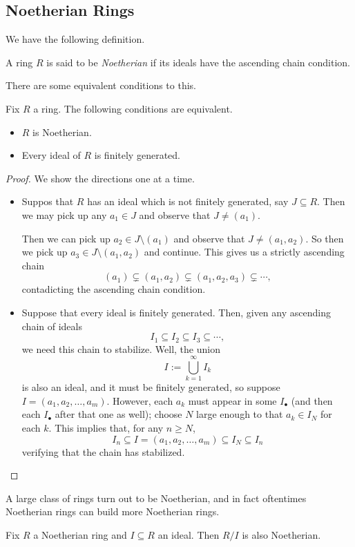 \subsection{Noetherian Rings}
We have the following definition.
\begin{definition}
	A ring $R$ is said to be \textit{Noetherian} if its ideals have the ascending chain condition.
\end{definition}
There are some equivalent conditions to this.
\begin{proposition} \label{prop:noethergrapbag}
	Fix $R$ a ring. The following conditions are equivalent.
	\begin{itemize}
		\item $R$ is Noetherian.
		\item Every ideal of $R$ is finitely generated.
	\end{itemize}
\end{proposition}
\begin{proof}
	We show the directions one at a time.
	\begin{itemize}
		\item Suppos that $R$ has an ideal which is not finitely generated, say $J\subseteq R$. Then we may pick up any $a_1\in J$ and observe that $J\ne(a_1)$.

		Then we can pick up $a_2\in J\setminus(a_1)$ and observe that $J\ne(a_1,a_2)$. So then we pick up $a_3\in J\setminus(a_1,a_2)$ and continue. This gives us a strictly ascending chain
		\[(a_1)\subsetneq(a_1,a_2)\subsetneq(a_1,a_2,a_3)\subsetneq\cdots,\]
		contadicting the ascending chain condition.
		\item Suppose that every ideal is finitely generated. Then, given any ascending chain of ideals
		\[I_1\subseteq I_2\subseteq I_3\subseteq\cdots,\]
		we need this chain to stabilize. Well, the union
		\[I:=\bigcup_{k=1}^\infty I_k\]
		is also an ideal, and it must be finitely generated, so suppose $I=(a_1,a_2,\ldots,a_m)$. However, each $a_k$ must appear in some $I_\bullet$ (and then each $I_\bullet$ after that one as well); choose $N$ large enough to that $a_k\in I_N$ for each $k$. This implies that, for any $n\ge N$,
		\[I_n\subseteq I=(a_1,a_2,\ldots,a_m)\subseteq I_N\subseteq I_n\]
		verifying that the chain has stabilized.
		\qedhere
	\end{itemize}
\end{proof}
A large class of rings turn out to be Noetherian, and in fact oftentimes Noetherian rings can build more Noetherian rings.
\begin{prop} \label{prop:noetherianquot}
	Fix $R$ a Noetherian ring and $I\subseteq R$ an ideal. Then $R/I$ is also Noetherian.
\end{prop}
